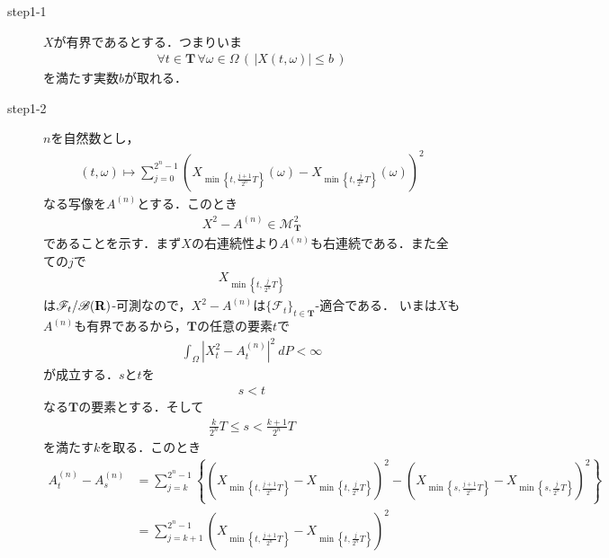 	\begin{sketch}\mbox{}
		\begin{description}
			\item[step1-1] $X$が有界であるとする．つまりいま
				\begin{align}
					\forall t \in \mathbf{T}\, \forall \omega \in \Omega\,
					\left(\, |X(t,\omega)| \leq b\, \right)
				\end{align}
				を満たす実数$b$が取れる．
			
			\item[step1-2] $n$を自然数とし，
				\begin{align}
					(t,\omega) \longmapsto \sum_{j=0}^{2^n-1} \left(X_{\min\left\{t,\frac{j+1}{2^n}T\right\}}(\omega)
					- X_{\min\left\{t,\frac{j}{2^n}T\right\}}(\omega)\right)^2
				\end{align}
				なる写像を$A^{(n)}$とする．このとき
				\begin{align}
					X^2 - A^{(n)} \in \mathscr{M}^2_{\mathbf{T}}
					\label{fom:thm_decomposition_of_local_martingales_2}
				\end{align}
				であることを示す．まず$X$の右連続性より$A^{(n)}$も右連続である．また全ての$j$で
				\begin{align}
					X_{\min\left\{t,\frac{j}{2^n}T\right\}}
				\end{align}
				は$\mathscr{F}_t/\mathscr{B}(\mathbf{R})$-可測なので，$X^2-A^{(n)}$は$\{\mathscr{F}_t\}_{t \in \mathbf{T}}$-適合である．
				いまは$X$も$A^{(n)}$も有界であるから，$\mathbf{T}$の任意の要素$t$で
				\begin{align}
					\int_{\Omega} \left|X_t^2-A_t^{(n)}\right|^2\ dP < \infty
				\end{align}
				が成立する．$s$と$t$を
				\begin{align}
					s < t
				\end{align}
				なる$\mathbf{T}$の要素とする．そして
				\begin{align}
					\frac{k}{2^n}T \leq s < \frac{k+1}{2^n}T
				\end{align}
				を満たす$k$を取る．このとき
				\begin{align}
					A^{(n)}_t - A^{(n)}_s
					&= \sum_{j=k}^{2^n-1} \left\{
					\left(X_{\min\left\{t,\frac{j+1}{2^n}T\right\}} - X_{\min\left\{t,\frac{j}{2^n}T\right\}}\right)^2
					- \left(X_{\min\left\{s,\frac{j+1}{2^n}T\right\}} - X_{\min\left\{s,\frac{j}{2^n}T\right\}}\right)^2\right\} \\
					&= \sum_{j=k+1}^{2^n-1} \left(X_{\min\left\{t,\frac{j+1}{2^n}T\right\}} - X_{\min\left\{t,\frac{j}{2^n}T\right\}}\right)^2

\end{align}
\end{description}
\end{sketch}
